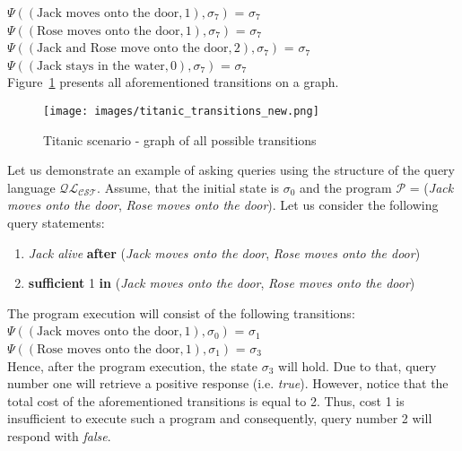 \documentclass[a4paper]{article}
\begin{document}
$\Psi((\text{Jack moves onto the door},1),\sigma_7)$ = $\sigma_7$ \\[0.1\baselineskip] 
$\Psi((\text{Rose moves onto the door},1),\sigma_7)$ = $\sigma_7$ \\[0.1\baselineskip] 
$\Psi((\text{Jack and Rose move onto the door},2),\sigma_7)$ = $\sigma_7$ \\[0.1\baselineskip]
$\Psi((\text{Jack stays in the water},0),\sigma_7)$ = $\sigma_7$ \\[0.7\baselineskip] 
Figure~\ref{fig:titanic_transitions} presents all aforementioned transitions on a graph.
\begin{figure}[H]
    \centering
    \texttt{[image: images/titanic\_transitions\_new.png]}
    \caption{Titanic scenario - graph of all possible transitions}
    \label{fig:titanic_transitions}
\end{figure}
Let us demonstrate an example of asking queries using the structure of the query language $\mathcal{QL_{CST}}$. Assume, that the initial state is $\sigma_0$ and the program $\mathcal{P}$ = (\textit{Jack moves onto the door}, \textit{Rose moves onto the door}). Let us consider the following query statements:
\begin{enumerate}
    \item \textit{Jack alive} \textbf{after} (\textit{Jack  moves onto the door}, \textit{Rose moves onto the door})
    \item \textbf{sufficient} 1 \textbf{in} (\textit{Jack  moves onto the door}, \textit{Rose moves onto the door})
\end{enumerate}
The program execution will consist of the following transitions: \\[0.5\baselineskip]
$\Psi((\text{Jack  moves onto the door},1),\sigma_0)$ = $\sigma_1$ \\[0.1\baselineskip] 
$\Psi((\text{Rose  moves onto the door},1),\sigma_1)$ = $\sigma_3$ \\[0.5\baselineskip]
Hence, after the program execution, the state $\sigma_3$ will hold. Due to that, query number one will retrieve a positive response (i.e. \textit{true}). However, notice that the total cost of the aforementioned transitions is equal to 2. Thus, cost 1 is insufficient to execute such a program and consequently, query number 2 will respond with \textit{false}.
\end{document}
